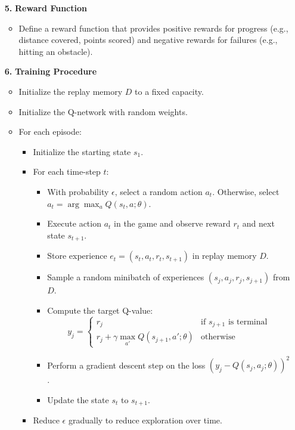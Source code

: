 \documentclass{article} %
\begin{document}
\begin{itemize}
    \item[\textbf{5.}] \textbf{Reward Function}
    \begin{itemize}
        \item Define a reward function that provides positive rewards for progress (e.g., distance covered, points scored) and negative rewards for failures (e.g., hitting an obstacle).
    \end{itemize}

    \item[\textbf{6.}] \textbf{Training Procedure}
    \begin{itemize}
        \item Initialize the replay memory \( D \) to a fixed capacity.
        \item Initialize the Q-network with random weights.
        \item For each episode:
        \begin{itemize}
            \item Initialize the starting state \( s_1 \).
            \item For each time-step \( t \):
            \begin{itemize}
                \item With probability \( \epsilon \), select a random action \( a_t \). Otherwise, select \( a_t = \arg\max_a Q(s_t, a; \theta) \).
                \item Execute action \( a_t \) in the game and observe reward \( r_t \) and next state \( s_{t+1} \).
                \item Store experience \( e_t = (s_t, a_t, r_t, s_{t+1}) \) in replay memory \( D \).
                \item Sample a random minibatch of experiences \( (s_j, a_j, r_j, s_{j+1}) \) from \( D \).
                \item Compute the target Q-value:
                \[
                y_j = \begin{cases}
                r_j & \text{if } s_{j+1} \text{ is terminal} \\
                r_j + \gamma \max_{a'} Q(s_{j+1}, a'; \theta) & \text{otherwise}
                \end{cases}
                \]
                \item Perform a gradient descent step on the loss \( (y_j - Q(s_j, a_j; \theta))^2 \).
                \item Update the state \( s_t \) to \( s_{t+1} \).
            \end{itemize}
            \item Reduce \( \epsilon \) gradually to reduce exploration over time.
        \end{itemize}
    \end{itemize}
\end{itemize}
\end{document}
